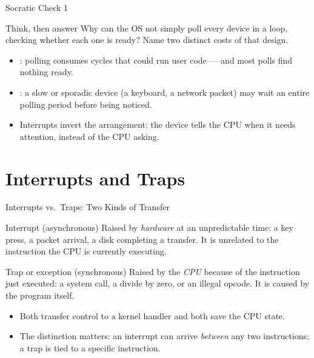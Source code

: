 \documentclass[aspectratio=169]{beamer}
\begin{document}
\begin{frame}{Socratic Check 1}
  \begin{block}{Think, then answer}
    Why can the OS not simply poll every device in a loop, checking whether each
    one is ready? Name two distinct costs of that design.
  \end{block}
  \vspace{0.2cm}
  \begin{itemize}
    \item {}: polling consumes cycles that could run user code ---
      and most polls find nothing ready.
    \item {}: a slow or sporadic device (a keyboard, a network
      packet) may wait an entire polling period before being noticed.
    \item Interrupts invert the arrangement: the device tells the CPU when it
      needs attention, instead of the CPU asking.
  \end{itemize}
\end{frame}


\section{Interrupts and Traps}

\begin{frame}{Interrupts vs.\ Traps: Two Kinds of Transfer}
  \begin{block}{Interrupt (asynchronous)}
    Raised by \emph{hardware} at an unpredictable time: a key press, a packet
    arrival, a disk completing a transfer. It is unrelated to the instruction
    the CPU is currently executing.
  \end{block}
  \begin{block}{Trap or exception (synchronous)}
    Raised by the     \emph{CPU} because of the instruction just executed: a system
    call, a divide by zero, or an illegal opcode. It is caused by the program
    itself.
  \end{block}
  \vspace{0.15cm}
  \begin{itemize}
    \item Both transfer control to a kernel handler and both save the CPU state.
    \item The distinction matters: an interrupt can arrive \emph{between} any two
      instructions; a trap is tied to a specific instruction.
  \end{itemize}
\end{frame}
\end{document}
